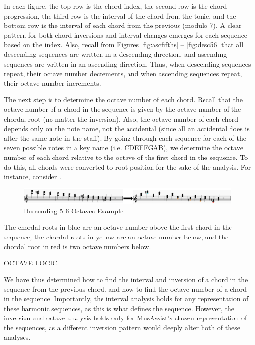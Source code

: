 \documentclass{article}
\begin{document}
In each figure, the top row is the chord index, the second row is the chord progression, the third row is the interval of the chord from the tonic, and the bottom row is the interval of each chord from the previous (modulo 7). A clear pattern for both chord inversions and interval changes emerges for each sequence based on the index. Also, recall from Figures \ref{fig:ascfifths} -- \ref{fig:desc56} that all descending sequences are written in a descending direction, and ascending sequences are written in an ascending direction. Thus, when descending sequences repeat, their octave number decrements, and when ascending sequences repeat, their octave number increments. 

The next step is to determine the octave number of each chord. Recall that the octave number of a chord in the sequence is given by the octave number of the chordal root (no matter the inversion). Also, the octave number of each chord depends only on the note name, not the accidental (since all an accidental does is alter the same note in the staff). By going through each sequence for each of the seven possible notes in a key name (i.e. CDEFFGAB), we determine the octave number of each chord relative to the octave of the first chord in the sequence. To do this, all chords were converted to root position for the sake of the analysis. For instance, consider . 

\begin{figure}[h!]
\centering
\includegraphics[width=1.1\textwidth]{images/desc56-example}
  \caption{Descending 5-6 Octaves Example}
  \label{fig:desc56-example}
\end{figure}

The chordal roots in blue are an octave number above the first chord in the sequence,  the chordal roots in yellow are an octave number below, and the chordal  root in red is two octave numbers below.

OCTAVE LOGIC

We have thus determined how to find the interval and inversion of a chord in the sequence from the previous chord, and how to find the octave number of a chord in the sequence. Importantly, the interval analysis holds for any representation of these harmonic sequences, as this is what defines the sequence. However, the inversion and octave analysis holds only for MusAssist's chosen representation of the sequences, as a different inversion pattern would deeply alter both of these analyses.
\end{document}
